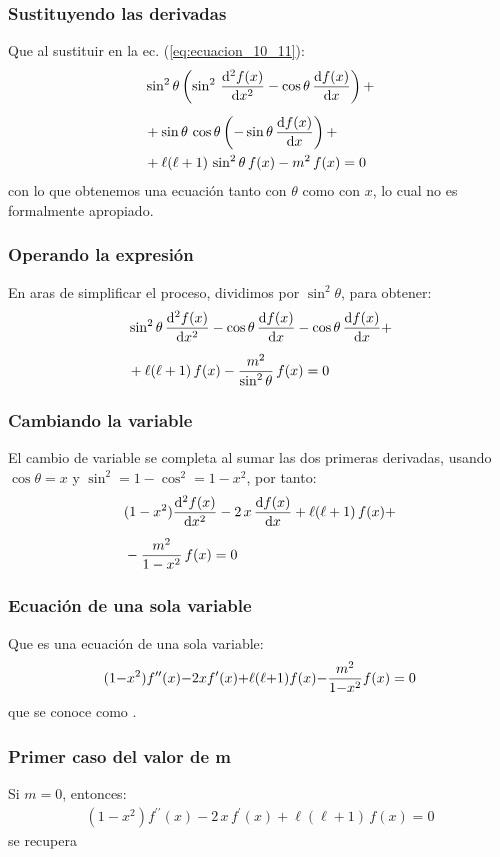 \documentclass[12pt]{beamer}
\begin{document}
\begin{frame}
\frametitle{Sustituyendo las derivadas}
Que al sustituir en la ec. (\ref{eq:ecuacion_10_11}):
\pause
\begin{align*}
&\sin^{2} \theta \left( \sin^{2} \, \dv[2]{f (x)}{x} - \cos \theta \, \dv{f (x)}{x} \right) + \\[0.5em]
&+ \sin \theta \, \cos \theta \left( - \sin \theta \, \dv{f (x)}{x} \right) + \\
&+ \ell (\ell + 1) \, \sin^{2} \theta \, f (x) - m^{2} \, f (x) = 0
\end{align*}
\pause
con lo que obtenemos una ecuación tanto con $\theta$ como con $x$, lo cual no es formalmente apropiado.
\end{frame}
\begin{frame}
\frametitle{Operando la expresión}
En aras de simplificar el proceso, dividimos por $\sin^{2} \theta$, para obtener:
\pause
\begin{align*}
&\sin^{2} \theta \, \dv[2]{f (x)}{x} - \cos \theta \, \dv{f (x)}{x} - \cos \theta \, \dv{f (x)}{x} + \\[0.5em]
&+ \ell (\ell + 1) \, f (x) - \dfrac{m^{2}}{\sin^{2} \theta} \, f (x) = 0
\end{align*}
\end{frame}
\begin{frame}
\frametitle{Cambiando la variable}
El cambio de variable se completa al sumar las dos primeras derivadas, \pause usando $\cos \theta = x$ y $\sin^{2} = 1 - \cos^{2} = 1 - x^{2}$, por tanto:
\pause
\begin{align*}
&(1 - x^{2}) \dv[2]{f (x)}{x} - 2 \, x \, \dv{f (x)}{x} + \ell (\ell +1 ) \, f (x) + \\[0.5em]
&- \dfrac{m^{2}}{1 - x^{2}} \, f (x) = 0
\end{align*}
\end{frame}
\begin{frame}
\frametitle{Ecuación de una sola variable}
Que es una ecuación de una sola variable:
\pause
\begin{align*}
(1 {-} x^{2}) {f}^{\prime \prime} (x) {-} 2 x {f}^{\prime} (x) {+} \ell (\ell {+} 1 ) f (x)  {-} \dfrac{m^{2}}{1 {-} x^{2}} f (x) = 0
\end{align*}
que se conoce como .
\end{frame}
\begin{frame}
\frametitle{Primer caso del valor de m}
Si $m = 0$, entonces:
\pause
\begin{align*}
(1 - x^{2}) f^{\prime \prime}(x) - 2 \, x \, f^{\prime}(x) + \ell (\ell +1 ) \, f (x) = 0
\end{align*}
se recupera 
\end{frame}
\end{document}
